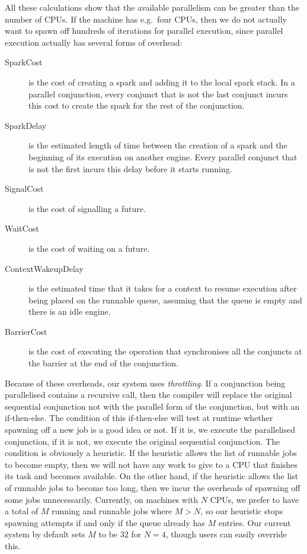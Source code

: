 All these calculations show that the available parallelism
can be greater than the number of CPUs.
If the machine has e.g.\ four CPUs,
then we do not actually want to spawn off
hundreds of iterations for parallel execution,
since parallel execution actually has several forms of overhead:

\begin{description}
\item[SparkCost]
is the cost of creating a spark and adding it to the local spark stack.
In a parallel conjunction,
every conjunct that is not the last conjunct incurs this cost
to create the spark for the rest of the conjunction.
\item[SparkDelay]
is the estimated length of time between the creation of a spark
and the beginning of its execution on another engine.
Every parallel conjunct that is not the first incurs this delay
before it starts running.
\item[SignalCost]
is the cost of signalling a future.
\item[WaitCost]
is the cost of waiting on a future.
\item[ContextWakeupDelay]
is the estimated time that it takes for a context to resume execution
after being placed on the runnable queue,
assuming that the queue is empty and there is an idle engine.
\item[BarrierCost]
is the cost of executing the operation
that synchronises all the conjuncts at the barrier
at the end of the conjunction.
\end{description}

Because of these overheads, our system uses \emph{throttling}.
If a conjunction being parallelised contains a recursive call,
then the compiler will replace the original sequential conjunction
not with the parallel form of the conjunction,
but with an if-then-else.
The condition of this if-then-else
will test at runtime
whether spawning off a new job is a good idea or not.
If it is, we execute the parallelised conjunction,
if it is not, we execute the original sequential conjunction.
The condition is obviously a heuristic.
If the heuristic allows the list of runnable jobs to become empty,
then we will not have any work to give to a CPU
that finishes its task and becomes available.
On the other hand,
if the heuristic allows the list of runnable jobs to become too long,
then we incur the overheads of spawning off some jobs unnecessarily.
Currently, on machines with $N$ CPUs,
we prefer to have a total of $M$ running and runnable jobs where $M > N$,
so our heuristic stops spawning attempts
if and only if the queue already has $M$ entries.
Our current system by default sets $M$ to be $32$ for $N = 4$,
though users can easily override this.

